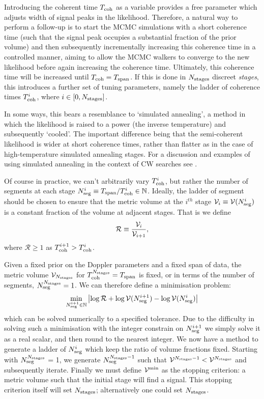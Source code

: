 \documentclass[aps, prd, twocolumn, superscriptaddress, floatfix, showpacs, nofootinbib, longbibliography]{revtex4-1}
\begin{document}
Introducing the coherent time $T_{\rm coh}$ as a variable provides a free parameter
which adjusts width of signal peaks in the likelihood. Therefore, a natural way
to perform a follow-up is to start the MCMC simulations with a short coherence
time (such that the signal peak occupies a substantial fraction of the prior
volume) and then subsequently incrementally increasing this coherence time in a
controlled manner, aiming to allow the MCMC walkers to converge to the new
likelihood before again increasing the coherence time. Ultimately, this
coherence time will be increased until $T_{\rm coh} = T_{\rm span}$. If this is done in
$N_{\rm stages}$ discreet \emph{stages}, this introduces a further set of tuning
parameters, namely the ladder of coherence times $T_{\rm coh}^{i}$, where $i \in [0,
N_{\rm stages}]$.

In some ways, this bears a resemblance to `simulated annealing', a method in
which the likelihood is raised to a power (the inverse temperature) and
subsequently `cooled'. The important difference being that the semi-coherent
likelihood is wider at short coherence times, rather than flatter as in the
case of high-temperature simulated annealing stages. For a discussion and
examples of using simulated annealing in the context of CW searches see
\citet{veitch2007}.

Of course in practice, we can't arbitrarily vary $T_{\rm coh}^i$, but rather the
number of segments at each stage $N_{\rm seg}^{i}\equiv T_{\rm span}/T_{\rm coh}^{i} \in
\mathbb{N}$.  Ideally, the ladder of segment should be chosen to ensure that
the metric volume at the $i^{th}$ stage $\mathcal{V}_i \equiv \mathcal{V}(N_{\rm seg}^i)$ is a constant
fraction of the volume at adjacent stages. That is we define
\begin{equation}
\mathcal{R} \equiv \frac{\mathcal{V}_i}{\mathcal{V}_{i+1}},
\end{equation}
where $\mathcal{R} \ge 1$ as $T_{\rm coh}^{i+1} > T_{\rm coh}^{i}$.

Given a fixed prior on the Doppler parameters and a fixed span of data, the
metric volume $\mathcal{V}_{N_{\rm stages}}$ for $T_{\rm coh}^{N_{\rm stages}} = T_{\rm span}$ is fixed, or in
terms of the number of segments, $N_{\rm seg}^{N_{\rm stages}} = 1$.
We can therefore define a minimisation problem:
\begin{align}
\min_{N_{\rm seg}^{i+1} \in \mathbb{N}}
\left| \log\mathcal{R} + \log\mathcal{V}(N_{\rm seg}^{i+1}) - \log\mathcal{V}(N_{\rm seg}^i)\right|
\end{align}
which can be solved numerically to a specified tolerance. Due to the difficulty
in solving such a minimisation with the integer constrain on $N_{\rm seg}^{i+1}$ we
simply solve it as a real scalar, and then round to the nearest integer. We now
have a method to generate a ladder of $N_{\rm seg}^{i}$ which keep the ratio of
volume fractions fixed. Starting with $N_{\rm seg}^{N_{\rm stages}}$ = 1, we generate
$N_{\rm seg}^{N_{\rm stages}-1}$ such that $\mathcal{V}^{N_{\rm stages}-1} < \mathcal{V}^{N_{\rm stages}}$ and
subsequently iterate.  Finally we must define $\mathcal{V}^{\rm min}$ as the stopping
criterion: a metric volume such that the initial stage will find a signal. This
stopping criterion itself will set $N_{\rm stages}$; alternatively one could set
$N_{\rm stages}$.
\end{document}
